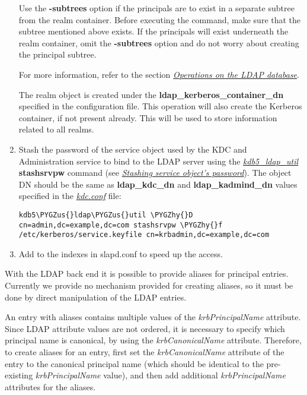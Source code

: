 \documentclass[letterpaper,10pt,english]{sphinxmanual}
\def\PYGZus{\char`\_}
\def\PYGZhy{\char`\-}
\begin{document}
\begin{enumerate}
Use the \textbf{-subtrees} option if the principals are to exist in a
separate subtree from the realm container.  Before executing the
command, make sure that the subtree mentioned above
 exists.  If the principals will
exist underneath the realm container, omit the \textbf{-subtrees} option
and do not worry about creating the principal subtree.

For more information, refer to the section {\hyperref[admin/database:ops-on-ldap]{\emph{Operations on the LDAP database}}}.

The realm object is created under the
\textbf{ldap\_kerberos\_container\_dn} specified in the configuration file.
This operation will also create the Kerberos container, if not
present already.  This will be used to store information related to
all realms.

\item {} 
Stash the password of the service object used by the KDC and
Administration service to bind to the LDAP server using the
{\hyperref[admin/admin_commands/kdb5_ldap_util:kdb5-ldap-util-8]{\emph{kdb5\_ldap\_util}}} \textbf{stashsrvpw} command (see
{\hyperref[admin/database:stash-ldap]{\emph{Stashing service object's password}}}).  The object DN should be the same as
\textbf{ldap\_kdc\_dn} and \textbf{ldap\_kadmind\_dn} values specified in the
{\hyperref[admin/conf_files/kdc_conf:kdc-conf-5]{\emph{kdc.conf}}} file:

\begin{Verbatim}[commandchars=\\\{\}]
kdb5\PYGZus{}ldap\PYGZus{}util \PYGZhy{}D cn=admin,dc=example,dc=com stashsrvpw \PYGZhy{}f /etc/kerberos/service.keyfile cn=krbadmin,dc=example,dc=com
\end{Verbatim}

\item {} 
Add  to the indexes in slapd.conf to speed up
the access.

\end{enumerate}

With the LDAP back end it is possible to provide aliases for principal
entries.  Currently we provide no mechanism provided for creating
aliases, so it must be done by direct manipulation of the LDAP
entries.

An entry with aliases contains multiple values of the
\emph{krbPrincipalName} attribute.  Since LDAP attribute values are not
ordered, it is necessary to specify which principal name is canonical,
by using the \emph{krbCanonicalName} attribute.  Therefore, to create
aliases for an entry, first set the \emph{krbCanonicalName} attribute of
the entry to the canonical principal name (which should be identical
to the pre-existing \emph{krbPrincipalName} value), and then add additional
\emph{krbPrincipalName} attributes for the aliases.
\end{document}
